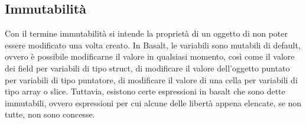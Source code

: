 \subsection{Immutabilità}
Con il termine immutabilità si intende la proprietà di un oggetto di non poter essere modificato una volta creato. In Basalt, le variabili
sono mutabili di default, ovvero è possibile modificarne il valore in qualsiasi momento, così come il valore dei field per variabili 
di tipo struct, di modificare il valore dell'oggetto puntato per variabili di tipo puntatore, di modificare il valore di una cella per 
variabili di tipo array o slice. Tuttavia, esistono certe espressioni in basalt che sono dette immutabili, ovvero espressioni per cui 
alcune delle libertà appena elencate, se non tutte, non sono concesse.




